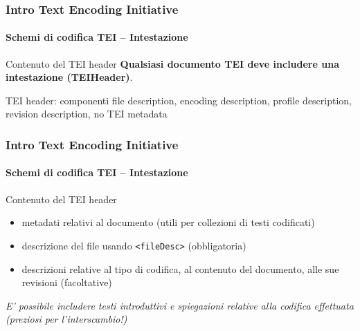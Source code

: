 


\begin{frame}
	\frametitle{Intro Text Encoding Initiative}
	\framesubtitle{Schemi di codifica TEI – Intestazione}
	\addtocounter{nframe}{1}

    \begin{block}{Contenuto del TEI header}
        \textbf{Qualsiasi documento TEI deve includere una intestazione (TEIHeader)}.
    \end{block}

    \begin{block}{TEI header: componenti}
        file description, encoding description, profile description, revision description, no TEI metadata
    \end{block}

\end{frame}

\begin{frame}
	\frametitle{Intro Text Encoding Initiative}
	\framesubtitle{Schemi di codifica TEI – Intestazione}
	\addtocounter{nframe}{1}

    \begin{block}{Contenuto del TEI header}
        \begin{itemize}
            \item metadati relativi al documento (utili per collezioni di testi
            codificati)
            \item descrizione del file usando \texttt{<fileDesc>} (obbligatoria)
            \item descrizioni relative al tipo di codifica, al contenuto del
            documento, alle sue revisioni (facoltative)
        \end{itemize}
    \end{block}
\textit{E' possibile includere testi introduttivi e spiegazioni relative alla
codifica effettuata (preziosi per l’interscambio!)}

\end{frame}





